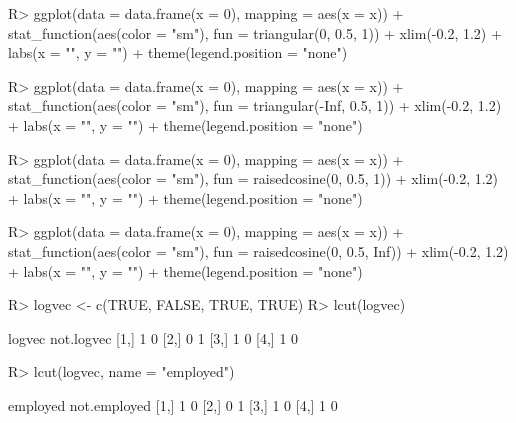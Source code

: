 \documentclass{article}\usepackage[]{graphicx}\usepackage[]{color}
\begin{document}
\begin{Schunk}
\begin{Sinput}
R> ggplot(data = data.frame(x = 0), mapping = aes(x = x)) + stat_function(aes(color = "sm"), 
       fun = triangular(0, 0.5, 1)) + xlim(-0.2, 1.2) + labs(x = "", y = "") + 
       theme(legend.position = "none")
\end{Sinput}
\end{Schunk}

\begin{Schunk}
\begin{Sinput}
R> ggplot(data = data.frame(x = 0), mapping = aes(x = x)) + stat_function(aes(color = "sm"), 
       fun = triangular(-Inf, 0.5, 1)) + xlim(-0.2, 1.2) + labs(x = "", y = "") + 
       theme(legend.position = "none")
\end{Sinput}
\end{Schunk}

\begin{Schunk}
\begin{Sinput}
R> ggplot(data = data.frame(x = 0), mapping = aes(x = x)) + stat_function(aes(color = "sm"), 
       fun = raisedcosine(0, 0.5, 1)) + xlim(-0.2, 1.2) + labs(x = "", y = "") + 
       theme(legend.position = "none")
\end{Sinput}
\end{Schunk}

\begin{Schunk}
\begin{Sinput}
R> ggplot(data = data.frame(x = 0), mapping = aes(x = x)) + stat_function(aes(color = "sm"), 
       fun = raisedcosine(0, 0.5, Inf)) + xlim(-0.2, 1.2) + labs(x = "", y = "") + 
       theme(legend.position = "none")
\end{Sinput}
\end{Schunk}

\begin{Schunk}
% --begin: "lcut.logical"
\begin{Sinput}
R> logvec <- c(TRUE, FALSE, TRUE, TRUE)
R> lcut(logvec)
\end{Sinput}
\begin{Soutput}
     logvec not.logvec
[1,]      1          0
[2,]      0          1
[3,]      1          0
[4,]      1          0
\end{Soutput}
\begin{Sinput}
R> lcut(logvec, name = "employed")
\end{Sinput}
\begin{Soutput}
     employed not.employed
[1,]        1            0
[2,]        0            1
[3,]        1            0
[4,]        1            0
\end{Soutput}
%
% --end: "lcut.logical"
\end{Schunk}
\end{document}
